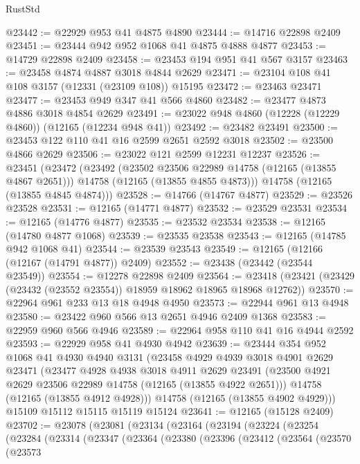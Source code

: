 \begin{lexlean}{RustStd}
\begin{coremodule}
@23442 := @22929 @953 @41 @4875 @4890
@23444 := @14716 @22898 @2409
@23451 := @23444 @942 @952 @1068 @41 @4875 @4888 @4877
@23453 := @14729 @22898 @2409
@23458 := @23453 @194 @951 @41 @567 @3157
@23463 := @23458 @4874 @4887 @3018 @4844 @2629
@23471 := @23104 @108 @41 @108 @3157 (@12331 (@23109 @108)) @15195
@23472 := @23463 @23471
@23477 := @23453 @949 @347 @41 @566 @4860
@23482 := @23477 @4873 @4886 @3018 @4854 @2629
@23491 := @23022 @948 @4860 (@12228 (@12229 @4860)) (@12165 (@12234 @948 @41))
@23492 := @23482 @23491
@23500 := @23453 @122 @110 @41 @16 @2599 @2651 @2592 @3018
@23502 := @23500 @4866 @2629
@23506 := @23022 @121 @2599 @12231 @12237
@23526 := @23451
    (@23472
      (@23492
        (@23502 @23506 @22989 @14758 (@12165 (@13855 @4867 @2651)))
        @14758
        (@12165 (@13855 @4855 @4873)))
      @14758
      (@12165 (@13855 @4845 @4874)))
@23528 := @14766 (@14767 @4877)
@23529 := @23526 @23528
@23531 := @12165 (@14771 @4877)
@23532 := @23529 @23531
@23534 := @12165 (@14776 @4877)
@23535 := @23532 @23534
@23538 := @12165 (@14780 @4877 @1068)
@23539 := @23535 @23538
@23543 := @12165 (@14785 @942 @1068 @41)
@23544 := @23539 @23543
@23549 := @12165 (@12166 (@12167 (@14791 @4877)) @2409)
@23552 := @23438 (@23442 (@23544 @23549))
@23554 := @12278 @22898 @2409
@23564 := @23418 (@23421 (@23429 (@23432 (@23552 @23554)) @18959 @18962 @18965 @18968 @12762))
@23570 := @22964 @961 @233 @13 @18 @4948 @4950
@23573 := @22944 @961 @13 @4948
@23580 := @23422 @960 @566 @13 @2651 @4946 @2409 @1368
@23583 := @22959 @960 @566 @4946
@23589 := @22964 @958 @110 @41 @16 @4944 @2592
@23593 := @22929 @958 @41 @4930 @4942
@23639 := @23444
    @354
    @952
    @1068
    @41
    @4930
    @4940
    @3131
    (@23458
      @4929
      @4939
      @3018
      @4901
      @2629
      @23471
      (@23477
        @4928
        @4938
        @3018
        @4911
        @2629
        @23491
        (@23500 @4921 @2629 @23506 @22989 @14758 (@12165 (@13855 @4922 @2651)))
        @14758
        (@12165 (@13855 @4912 @4928)))
      @14758
      (@12165 (@13855 @4902 @4929)))
    @15109
    @15112
    @15115
    @15119
    @15124
@23641 := @12165 (@15128 @2409)
@23702 := @23078
    (@23081
      (@23134
        (@23164
          (@23194
            (@23224
              (@23254
                (@23284
                  (@23314
                    (@23347
                      (@23364
                        (@23380
                          (@23396
                            (@23412
                              (@23564
                                (@23570
                                  (@23573

\end{coremodule}
\end{lexlean}
